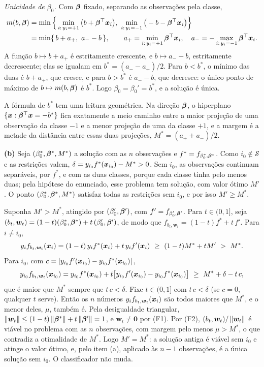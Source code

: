 \begin{solucao}
\emph{Unicidade de $\beta_0$.} Com $\bm{\beta}$ fixado, separando as observações pela classe,
\begin{align*}
  m(b,\bm{\beta})
  &=\min\Big\{\min_{i:\,y_i=+1}\big(b+\bm{\beta}^\top\bm{x}_i\big),\
              \min_{i:\,y_i=-1}\big(-b-\bm{\beta}^\top\bm{x}_i\big)\Big\}\\
  &=\min\{\,b+a_+,\ a_--b\,\},
  \qquad
  a_+=\min_{i:\,y_i=+1}\bm{\beta}^\top\bm{x}_i,\quad a_-=-\max_{i:\,y_i=-1}\bm{\beta}^\top\bm{x}_i .
\end{align*}
A função $b\mapsto b+a_+$ é estritamente crescente, e $b\mapsto a_--b$, estritamente
decrescente; elas se igualam em $b^*=(a_--a_+)/2$. Para $b<b^*$, o mínimo das duas é
$b+a_+$, que cresce, e para $b>b^*$ é $a_--b$, que decresce: o único ponto de máximo de
$b\mapsto m(b,\bm{\beta})$ é $b^*$. Logo $\beta_0=\beta_0'=b^*$, e a solução é única.

A fórmula de $b^*$ tem uma leitura geométrica. Na direção $\bm{\beta}$, o hiperplano
$\{\bm{x}:\bm{\beta}^\top\bm{x}=-b^*\}$ fica exatamente a meio caminho entre a maior projeção de uma
observação da classe $-1$ e a menor projeção de uma da classe $+1$, e a margem é a metade da
distância entre essas duas projeções, $M^*=(a_++a_-)/2$.

\smallskip
\textbf{(b)} Seja $(\beta_0^*,\bm{\beta}^*,M^*)$ a solução com as $n$ observações e
$f^*=f_{\beta_0^*,\bm{\beta}^*}$. Como $i_0\notin\mathcal S$ e as restrições valem,
$\delta=y_{i_0}f^*(\bm{x}_{i_0})-M^*>0$. Sem $i_0$, as observações continuam separáveis, por $f^*$,
e com as duas classes, porque cada classe tinha pelo menos duas; pela hipótese do enunciado,
esse problema tem solução, com valor ótimo $M'$. O ponto $(\beta_0^*,\bm{\beta}^*,M^*)$ satisfaz
todas as restrições sem $i_0$, e por isso $M'\ge M^*$.

Suponha $M'>M^*$, atingido por $(\beta_0',\bm{\beta}')$, com $f'=f_{\beta_0',\bm{\beta}'}$. Para
$t\in(0,1]$, seja $(b_t,\bm w_t)=(1-t)(\beta_0^*,\bm{\beta}^*)+t\,(\beta_0',\bm{\beta}')$, de modo que
$f_{b_t,\bm w_t}=(1-t)f^*+t\,f'$. Para $i\ne i_0$,
\[
  y_if_{b_t,\bm w_t}(\x_i)=(1-t)\,y_if^*(\x_i)+t\,y_if'(\x_i)\ \ge\ (1-t)M^*+tM'\ >\ M^* .
\]
Para $i_0$, com $c=\left\lvert y_{i_0}f'(\bm{x}_{i_0})-y_{i_0}f^*(\bm{x}_{i_0}) \right\rvert$,
\[
  y_{i_0}f_{b_t,\bm w_t}(\bm{x}_{i_0})
  =y_{i_0}f^*(\bm{x}_{i_0})+t\big[y_{i_0}f'(\bm{x}_{i_0})-y_{i_0}f^*(\bm{x}_{i_0})\big]
  \ \ge\ M^*+\delta-t\,c ,
\]
que é maior que $M^*$ sempre que $t\,c<\delta$. Fixe $t\in(0,1]$ com $t\,c<\delta$ (se $c=0$,
qualquer $t$ serve). Então os $n$ números $y_if_{b_t,\bm w_t}(\bm{x}_i)$ são todos maiores que
$M^*$, e o menor deles, $\mu$, também é. Pela desigualdade triangular,
$\left\lVert \bm w_t \right\rVert\le(1-t)\left\lVert \bm{\beta}^* \right\rVert+t\left\lVert \bm{\beta}' \right\rVert=1$, e $\bm w_t\ne\bm0$ por (F1). Por
(F2), $(b_t,\bm w_t)/\left\lVert \bm w_t \right\rVert$ é viável no problema com as $n$ observações, com margem pelo
menos $\mu>M^*$, o que contradiz a otimalidade de $M^*$. Logo $M'=M^*$: a solução antiga é
viável sem $i_0$ e atinge o valor ótimo, e, pelo item (a), aplicado às $n-1$ observações, é a
única solução sem $i_0$. O classificador não muda.


\end{solucao}
